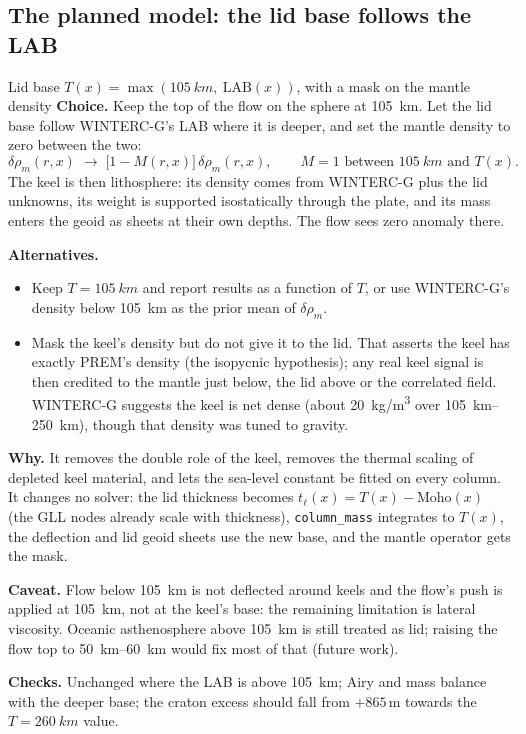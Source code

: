 \subsection{The planned model: the lid base follows the LAB}
\begin{decision}{Lid base $T(x) = \max(\qty{105}{km},\ \mathrm{LAB}(x))$, with a mask on the mantle density}
\textbf{Choice.} Keep the top of the flow on the sphere at \qty{105}{km}.
Let the lid base follow WINTERC-G's LAB where it is deeper, and set the mantle density to zero between the two:
\[
    \delta\rho_m(r,x) \;\to\; \big[1 - M(r,x)\big]\,\delta\rho_m(r,x),
    \qquad M = 1 \text{ between } \qty{105}{km} \text{ and } T(x).
\]
The keel is then lithosphere: its density comes from WINTERC-G plus the lid unknowns, its weight is supported isostatically through the plate, and its mass enters the geoid as sheets at their own depths.
The flow sees zero anomaly there.

\textbf{Alternatives.}
\begin{itemize}[nosep]
\item Keep $T=\qty{105}{km}$ and report results as a function of $T$, or use WINTERC-G's density below \qty{105}{km} as the prior mean of $\delta\rho_m$.
\item Mask the keel's density but do not give it to the lid. That asserts the keel has exactly PREM's density (the isopycnic hypothesis); any real keel signal is then credited to the mantle just below, the lid above or the correlated field. WINTERC-G suggests the keel is net dense (about \qty{+20}{kg/m^3} over \qtyrange{105}{250}{km}), though that density was tuned to gravity.
\end{itemize}

\textbf{Why.} It removes the double role of the keel, removes the thermal scaling of depleted keel material, and lets the sea-level constant be fitted on every column.
It changes no solver: the lid thickness becomes $t_\ell(x) = T(x) - \mathrm{Moho}(x)$ (the GLL nodes already scale with thickness), \texttt{column\_mass} integrates to $T(x)$, the deflection and lid geoid sheets use the new base, and the mantle operator gets the mask.

\textbf{Caveat.} Flow below \qty{105}{km} is not deflected around keels and the flow's push is applied at \qty{105}{km}, not at the keel's base: the remaining limitation is lateral viscosity.
Oceanic asthenosphere above \qty{105}{km} is still treated as lid; raising the flow top to \qtyrange{50}{60}{km} would fix most of that (future work).

\textbf{Checks.} Unchanged where the LAB is above \qty{105}{km}; Airy and mass balance with the deeper base; the craton excess should fall from $+865$\,m towards the $T=\qty{260}{km}$ value.
\end{decision}

